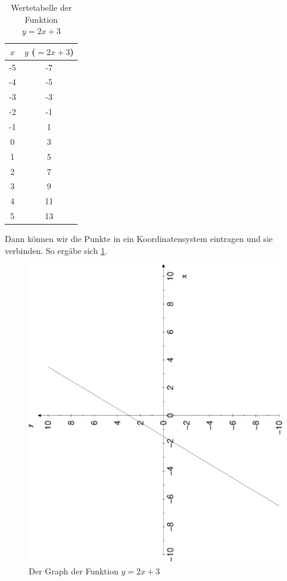 \documentclass[%
11pt,%
twoside,%
titlepage,%
german,%
headsepline%
]{scrartcl}
\begin{document}
{\begin{table}[b!]
\centering
\begin{tabular}{|c|c|}
\hline
$x$ & $y$ ($=2x+3$) \\ \hline\hline
-5 & -7 \\ \hline
-4 & -5 \\ \hline
-3 & -3 \\ \hline
-2 & -1 \\ \hline
-1 & 1 \\ \hline
0 & 3 \\ \hline
1 & 5 \\ \hline
2 & 7 \\ \hline
3 & 9 \\ \hline
4 & 11 \\ \hline
5 & 13 \\ \hline
\end{tabular}
\caption{Wertetabelle der Funktion $y=2x+3$}
\label{tab:linfkt2:2xplus3}
\end{table}

Dann k\"onnen wir die Punkte in ein Koordinatensystem eintragen und sie verbinden. So erg\"abe sich \ref{fig:linfkt2:2xplus3}.

\begin{figure}[b!]
  \centering
  \includegraphics[angle=-90,width=\columnwidth]{pictures/2xplus3.eps}
  \caption{Der Graph der Funktion $y=2x+3$}
  \label{fig:linfkt2:2xplus3}
\end{figure}

}
\end{document}
